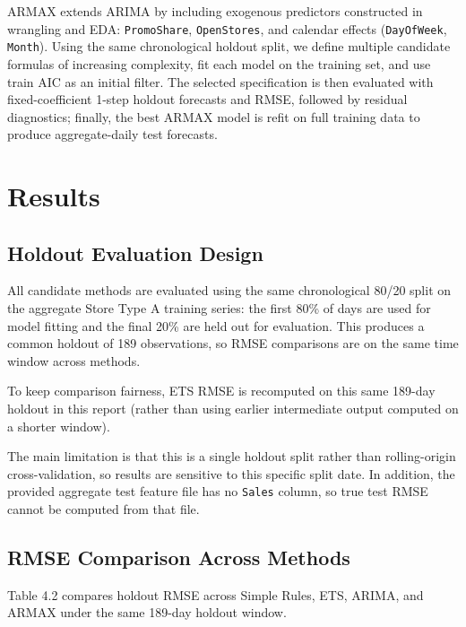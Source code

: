 \documentclass[
  12pt,
]{article}
\begin{document}
ARMAX extends ARIMA by including exogenous predictors constructed in
wrangling and EDA: \texttt{PromoShare}, \texttt{OpenStores}, and
calendar effects (\texttt{DayOfWeek}, \texttt{Month}). Using the same
chronological holdout split, we define multiple candidate formulas of
increasing complexity, fit each model on the training set, and use train
AIC as an initial filter. The selected specification is then evaluated
with fixed-coefficient 1-step holdout forecasts and RMSE, followed by
residual diagnostics; finally, the best ARMAX model is refit on full
training data to produce aggregate-daily test forecasts.

\section{Results}\label{results}

\subsection{Holdout Evaluation Design}\label{holdout-evaluation-design}

All candidate methods are evaluated using the same chronological 80/20
split on the aggregate Store Type A training series: the first 80\% of
days are used for model fitting and the final 20\% are held out for
evaluation. This produces a common holdout of 189 observations, so RMSE
comparisons are on the same time window across methods.

To keep comparison fairness, ETS RMSE is recomputed on this same 189-day
holdout in this report (rather than using earlier intermediate output
computed on a shorter window).

The main limitation is that this is a single holdout split rather than
rolling-origin cross-validation, so results are sensitive to this
specific split date. In addition, the provided aggregate test feature
file has no \texttt{Sales} column, so true test RMSE cannot be computed
from that file.

\subsection{RMSE Comparison Across
Methods}\label{rmse-comparison-across-methods}

Table 4.2 compares holdout RMSE across Simple Rules, ETS, ARIMA, and
ARMAX under the same 189-day holdout window.
\end{document}
